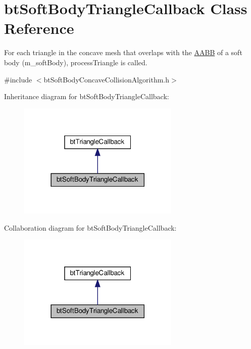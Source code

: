 \hypertarget{classbtSoftBodyTriangleCallback}{}\section{bt\+Soft\+Body\+Triangle\+Callback Class Reference}
\label{classbtSoftBodyTriangleCallback}


For each triangle in the concave mesh that overlaps with the \hyperlink{classAABB}{A\+A\+BB} of a soft body (m\+\_\+soft\+Body), process\+Triangle is called.  




{\ttfamily \#include $<$bt\+Soft\+Body\+Concave\+Collision\+Algorithm.\+h$>$}



Inheritance diagram for bt\+Soft\+Body\+Triangle\+Callback\+:
\nopagebreak
\begin{figure}[H]
\begin{center}
\leavevmode
\includegraphics[width=218pt]{classbtSoftBodyTriangleCallback__inherit__graph}
\end{center}
\end{figure}


Collaboration diagram for bt\+Soft\+Body\+Triangle\+Callback\+:
\nopagebreak
\begin{figure}[H]
\begin{center}
\leavevmode
\includegraphics[width=218pt]{classbtSoftBodyTriangleCallback__coll__graph}
\end{center}
\end{figure}

